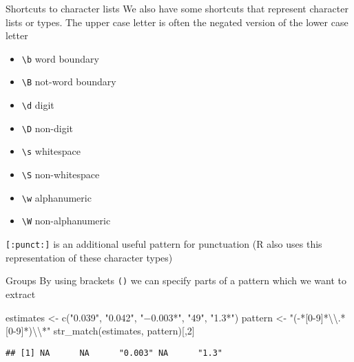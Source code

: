 \documentclass[
  10pt,
  ignorenonframetext,
  aspectratio=169]{beamer}
\newenvironment{Shaded}{\begin{snugshade}}{\end{snugshade}}
\newcommand{\DecValTok}[1]{\textcolor[rgb]{0.86,0.86,0.80}{#1}}
\newcommand{\FunctionTok}[1]{\textcolor[rgb]{0.94,0.94,0.56}{#1}}
\newcommand{\NormalTok}[1]{\textcolor[rgb]{0.80,0.80,0.80}{#1}}
\newcommand{\OtherTok}[1]{\textcolor[rgb]{0.94,0.94,0.56}{#1}}
\newcommand{\SpecialCharTok}[1]{\textcolor[rgb]{0.86,0.64,0.64}{#1}}
\newcommand{\StringTok}[1]{\textcolor[rgb]{0.80,0.58,0.58}{#1}}
\providecommand{\tightlist}{%
  \setlength{\itemsep}{0pt}\setlength{\parskip}{0pt}}
\begin{document}
\begin{frame}[fragile]{Shortcuts to character lists}
\protect\hypertarget{shortcuts-to-character-lists}{}
We also have some shortcuts that represent character lists or types. The
upper case letter is often the negated version of the lower case letter

\begin{itemize}
\tightlist
\item
  \texttt{\textbackslash{}b} word boundary
\item
  \texttt{\textbackslash{}B} not-word boundary
\item
  \texttt{\textbackslash{}d} digit
\item
  \texttt{\textbackslash{}D} non-digit
\item
  \texttt{\textbackslash{}s} whitespace
\item
  \texttt{\textbackslash{}S} non-whitespace
\item
  \texttt{\textbackslash{}w} alphanumeric
\item
  \texttt{\textbackslash{}W} non-alphanumeric
\end{itemize}

\texttt{{[}:punct:{]}} is an additional useful pattern for punctuation
(R also uses this representation of these character types)
\end{frame}

\begin{frame}[fragile]{Groups}
\protect\hypertarget{groups}{}
By using brackets \texttt{()} we can specify parts of a pattern which we
want to extract

\begin{Shaded}
\begin{Highlighting}[]
\NormalTok{estimates }\OtherTok{\textless{}{-}} \FunctionTok{c}\NormalTok{(}\StringTok{"0.039"}\NormalTok{, }\StringTok{"0.042"}\NormalTok{, }\StringTok{"−0.003*"}\NormalTok{, }\StringTok{"49"}\NormalTok{, }\StringTok{"1.3*"}\NormalTok{)}
\NormalTok{pattern }\OtherTok{\textless{}{-}} \StringTok{"({-}*[0{-}9]*}\SpecialCharTok{\textbackslash{}\textbackslash{}}\StringTok{.*[0{-}9]*)}\SpecialCharTok{\textbackslash{}\textbackslash{}}\StringTok{*"}
\FunctionTok{str\_match}\NormalTok{(estimates, pattern)[,}\DecValTok{2}\NormalTok{]}
\end{Highlighting}
\end{Shaded}

\begin{verbatim}
## [1] NA      NA      "0.003" NA      "1.3"
\end{verbatim}
\end{frame}
\end{document}
